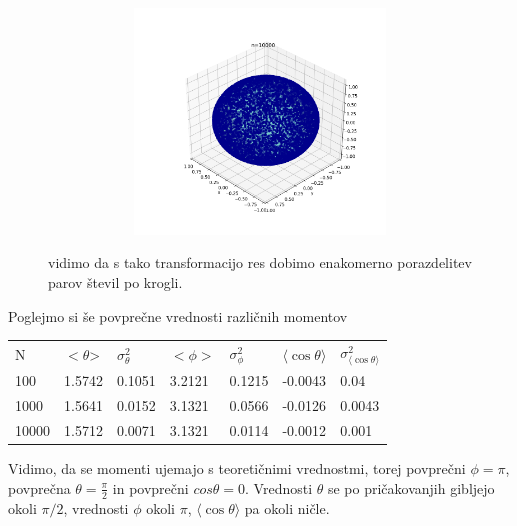 \documentclass[11pt, a4paper]{article}
\begin{document}
\begin{figure}[H]
\hspace*{-2.5cm}
\begin{subfigure}[b]{0.65\textwidth}
  \includegraphics[width=1\textwidth, height = 6cm]{druga_krogla_3.png}
 \end{subfigure}%
 \caption{vidimo da s tako transformacijo res dobimo enakomerno porazdelitev parov števil po krogli.} 

\end{figure} 
Poglejmo si še povprečne vrednosti različnih momentov
\begin{table} [H]

\label{my-label}
\begin{tabular}{lllllll}
\centering
N & $<\theta$> & $\sigma^2_{\theta}$ & $<\phi>$ & $\sigma^2_{\phi}$ & $\langle\cos{\theta}\rangle$ & $\sigma^2_{\langle\cos{\theta}\rangle}$ \\
100 & 1.5742 & 0.1051 & 3.2121 & 0.1215 & -0.0043 & 0.04 \\
1000 & 1.5641 & 0.0152 & 3.1321 & 0.0566 & -0.0126 & 0.0043 \\
10000 & 1.5712 & 0.0071 & 3.1321 & 0.0114 & -0.0012 & 0.001 
\end{tabular}
\end{table}
Vidimo, da se momenti ujemajo s teoretičnimi vrednostmi, torej povprečni $\phi = \pi$, povprečna $\theta = \frac{\pi}{2}$ in povprečni $cos \theta = 0$.
Vrednosti $\theta$ se po pričakovanjih gibljejo okoli $\pi/2$, vrednosti $\phi$ okoli $\pi$, $\langle\cos{\theta}\rangle$ pa okoli ničle. 
\end{document}
